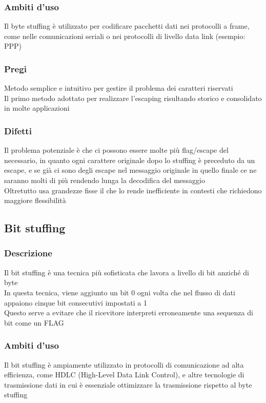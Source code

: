 \documentclass[10pt,oneside,a4paper]{article}
\begin{document}
\subsubsection{Ambiti d'uso}
Il byte stuffing è utilizzato per codificare pacchetti dati nei protocolli a frame, come nelle comunicazioni seriali o nei protocolli di livello data link (esempio: PPP)
\subsubsection{Pregi}
Metodo semplice e intuitivo per gestire il problema dei caratteri riservati\\
Il primo metodo adottato per realizzare l'escaping risultando storico e consolidato in molte applicazioni
\subsubsection{Difetti}
Il problema potenziale è che ci possono essere molte più flag/escape del necessario, in quanto ogni carattere originale dopo lo stuffing è preceduto da un escape, e se già ci sono degli escape nel messaggio originale in quello finale ce ne saranno molti di più rendendo lunga la decodifica del messaggio\\
Oltretutto usa grandezze fisse il che lo rende inefficiente in contesti che richiedono maggiore flessibilità
\subsection{Bit stuffing}
\subsubsection{Descrizione}
Il bit stuffing è una tecnica più sofisticata che lavora a livello di bit anziché di byte\\
In questa tecnica, viene aggiunto un bit 0 ogni volta che nel flusso di dati appaiono cinque bit consecutivi impostati a 1\\ Questo serve a evitare che il ricevitore interpreti erroneamente una sequenza di bit come un FLAG 
\subsubsection{Ambiti d'uso}
Il bit stuffing è ampiamente utilizzato in protocolli di comunicazione ad alta efficienza, come HDLC (High-Level Data Link Control), e altre tecnologie di trasmissione dati in cui è essenziale ottimizzare la trasmissione rispetto al byte stuffing
\end{document}
